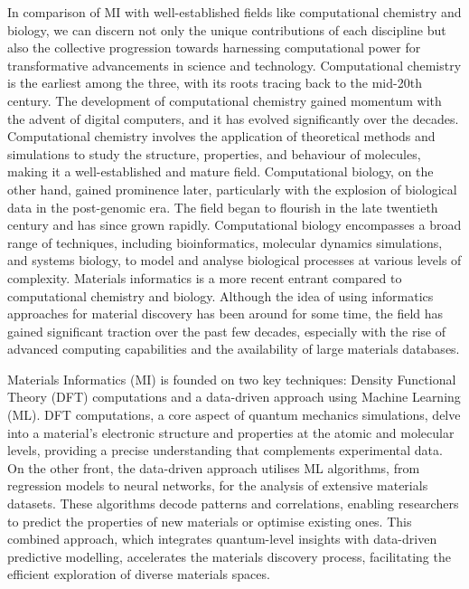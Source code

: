 In comparison of MI with well-established fields like computational chemistry and biology, we can discern not only the unique contributions of each discipline but also the collective progression towards harnessing computational power for transformative advancements in science and technology.
Computational chemistry is the earliest among the three, with its roots tracing back to the mid-20th century. The development of computational chemistry gained momentum with the advent of digital computers, and it has evolved significantly over the decades. Computational chemistry involves the application of theoretical methods and simulations to study the structure, properties, and behaviour of molecules, making it a well-established and mature field.
Computational biology, on the other hand, gained prominence later, particularly with the explosion of biological data in the post-genomic era. The field began to flourish in the late twentieth century and has since grown rapidly. Computational biology encompasses a broad range of techniques, including bioinformatics, molecular dynamics simulations, and systems biology, to model and analyse biological processes at various levels of complexity.
Materials informatics is a more recent entrant compared to computational chemistry and biology. Although the idea of using informatics approaches for material discovery has been around for some time, the field has gained significant traction over the past few decades, especially with the rise of advanced computing capabilities and the availability of large materials databases. 

Materials Informatics (MI) is founded on two key techniques: Density Functional Theory (DFT) computations and a data-driven approach using Machine Learning (ML). DFT computations, a core aspect of quantum mechanics simulations, delve into a material's electronic structure and properties at the atomic and molecular levels, providing a precise understanding that complements experimental data. On the other front, the data-driven approach utilises ML algorithms, from regression models to neural networks, for the analysis of extensive materials datasets. 
These algorithms decode patterns and correlations, enabling researchers to predict the properties of new materials or optimise existing ones. 
This combined approach, which integrates quantum-level insights with data-driven predictive modelling, accelerates the materials discovery process, facilitating the efficient exploration of diverse materials spaces.

